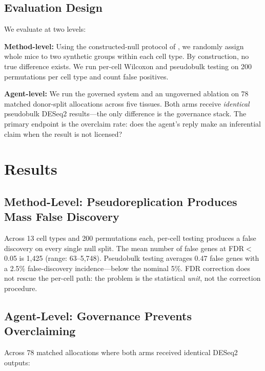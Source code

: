 \documentclass[11pt]{article}
\begin{document}
\subsection{Evaluation Design}

We evaluate at two levels:

\textbf{Method-level:} Using the constructed-null protocol of
\citet{squair2021}, we randomly assign whole mice to two synthetic groups
within each cell type. By construction, no true difference exists. We run
per-cell Wilcoxon and pseudobulk testing on 200 permutations per cell type and
count false positives.

\textbf{Agent-level:} We run the governed system and an ungoverned ablation on
78 matched donor-split allocations across five tissues. Both arms receive
\textit{identical} pseudobulk DESeq2 results---the only difference is the
governance stack. The primary endpoint is the overclaim rate: does the agent's
reply make an inferential claim when the result is not licensed?

\section{Results}

\subsection{Method-Level: Pseudoreplication Produces Mass False Discovery}

Across 13 cell types and 200 permutations each, per-cell testing produces a
false discovery on every single null split. The mean number of false genes at
FDR$<$0.05 is 1,425 (range: 63--5,748). Pseudobulk testing averages 0.47
false genes with a 2.5\% false-discovery incidence---below the nominal 5\%.
FDR correction does not rescue the per-cell path: the problem is the
statistical \textit{unit}, not the correction procedure.

\subsection{Agent-Level: Governance Prevents Overclaiming}

Across 78 matched allocations where both arms received identical DESeq2
outputs:
\end{document}
